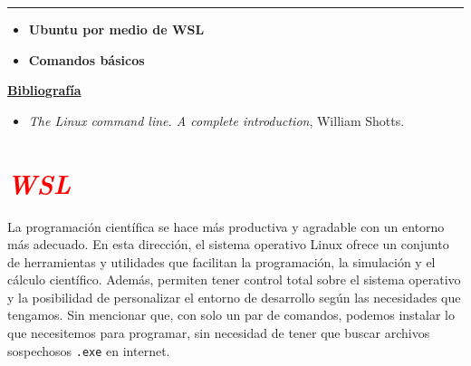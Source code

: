 \documentclass[12pt]{article}
\begin{document}
\thispagestyle{firstpage}
\vspace*{1.5cm}

\begin{center}
    \rule{\textwidth}{0.4pt}
\end{center}

\begin{itemize}[leftmargin=*,label=\textcolor{red}{\ensuremath{\blacktriangleright}}]
    \item \textbf{ Ubuntu por medio de WSL}
    \item \textbf{ Comandos básicos}
\end{itemize}

\noindent
\textbf{\underline{Bibliografía}}
\begin{itemize}[leftmargin=*, label={\textcolor{blue}{$\bullet$}}]
    \item \textit{The Linux command line. A complete introduction}, William Shotts.
\end{itemize}


\section*{\textcolor{red}{\textit{WSL}}}

La programación científica se hace más productiva y agradable con un entorno más adecuado. 
En esta dirección, el sistema operativo Linux ofrece un conjunto de herramientas y utilidades que facilitan 
la programación, la simulación y el cálculo científico. Además, permiten tener control total sobre el 
sistema operativo y la posibilidad de personalizar el entorno de desarrollo según las necesidades que tengamos. 
Sin mencionar que, con solo un par de comandos, podemos instalar lo que necesitemos para programar, 
sin necesidad de tener que buscar archivos sospechosos \lstinline|.exe| en internet. 
\end{document}
